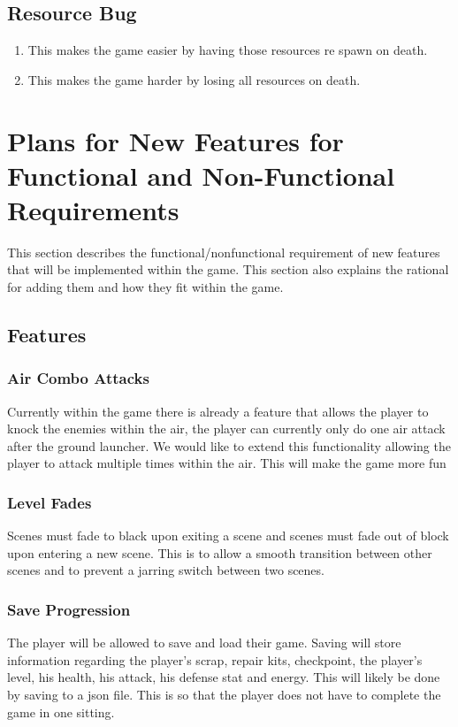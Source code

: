\documentclass{article}
\begin{document}
\subsection*{Resource Bug}
\begin{enumerate}
	\item This makes the game easier by having those resources re spawn on death.
	\item This makes the game harder by losing all resources on death.
\end{enumerate}

\section*{Plans for New Features for Functional and Non-Functional Requirements} 
This section describes the functional/nonfunctional requirement of new features that will be implemented within the game. This section also explains the rational for adding them and how they fit within the game.
\subsection*{Features}
\subsubsection*{Air Combo Attacks}
Currently within the game there is already a feature that allows the player to knock the enemies within the air, the player can currently only do one air attack after the ground launcher.  We would like to extend this functionality allowing the player to attack multiple times within the air. This will make the game more fun

\subsubsection*{Level Fades}
Scenes must fade to black upon exiting a scene and scenes must fade out of block upon entering a new scene. This is to allow a smooth transition between other scenes and to prevent a jarring switch between two scenes.

\subsubsection*{Save Progression}
The player will be allowed to save and load their game. Saving will store information regarding the player's scrap, repair kits, checkpoint, the player's level, his health, his attack, his defense stat and energy. This will likely be done by saving to a json file. This is so that the player does not have to complete the game in one sitting.
\end{document}
